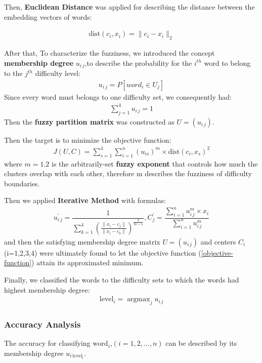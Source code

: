 Then, \textbf{Euclidean Distance} was applied for describing the distance between the embedding vectors of words:

\begin{align}
    \mathrm{dist}(c_{i},x_{i})=\|c_{i}-x_{i}\|_{2}
\end{align}



After that, To characterize the fuzziness, we introduced the concept \textbf{membership degree} $u_{i\,j}$,to describe the probability for the $i^{th}$ word to belong to the $j^{th}$ difficulty level:
\begin{align}
    u_{i\,j}=P[word_{i}\in U_{j}]
\end{align}
Since every word must belongs to one difficulty set, we consequently had:
\begin{align}
    \sum_{j=1}^{4}u_{i\,j}=1
\end{align}
Then the \textbf{fuzzy partition matrix} was constructed as $U=(u_{i\,j})$.

Then the target is to minimize the objective function:
\begin{align}
    J(U,C)=\sum_{s=1}^{4}\sum_{i=1}^{n}(u_{is})^{m}\times \mathrm{dist}(c_{i},x_{s})^{2}
    \label{objective-function}
\end{align}
where $m=1.2$ is the arbitrarily-set \textbf{fuzzy exponent} that controls how much the clusters overlap with each other, therefore m describes the fuzziness of difficulty boundaries. 

Then we applied \textbf{Iterative Method} with formulas:
\begin{align}
    u_{i\,j}^{'}=\dfrac{1}{\sum\limits_{k=1}^{4}(\frac{\|x_{i}-c_{j}\|}{\|x_{i}-c_{k}\|})^{\frac{2}{m-1}}}, C_{j}^{'}=\dfrac{\sum\limits_{i=1}^{n}u_{i\,j}^{m}\times x_{i}}{\sum\limits_{i=1}^{n}u_{i\,j}^{m}}
\end{align}
and then the satisfying membership degree matrix $U=(u_{i\,j})$ and centers $C_{i}$ (i=1,2,3,4) were ultimately found to let the objective function (\ref{objective-function}) attain its approximated minimum.

Finally, we classified the words to the difficulty sets to which the words had highest membership degree:
\begin{align}
    \mathrm{level}_{i}=\mathop{\arg\max}_{j} u_{i\,j}
\end{align}

\subsubsection{Accuracy Analysis}
The accuracy for classifying $\mathrm{word}_{i}$,$(i=1,2,...,n)$ can be described by its membership degree $u_{i\,\mathrm{level_{i}}}$.

